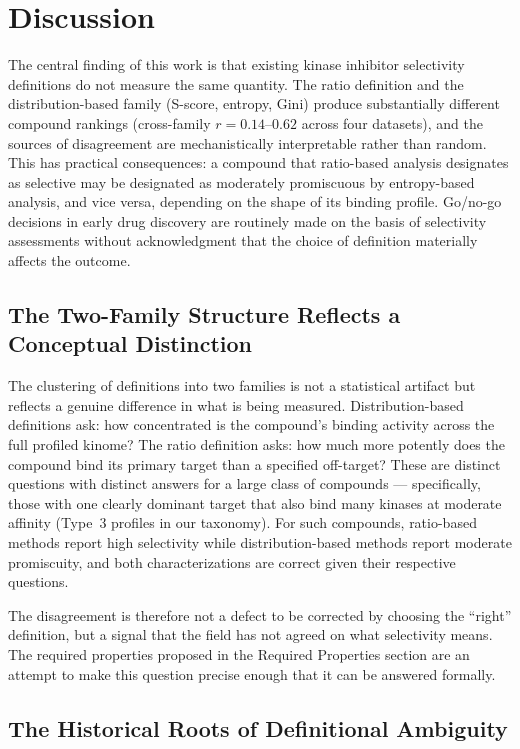 \documentclass[journal=jcisd8,manuscript=article]{achemso}
\begin{document}
\section{Discussion}
\label{sec:discussion}

The central finding of this work is that existing kinase inhibitor selectivity
definitions do not measure the same quantity.
The ratio definition and the distribution-based family (S-score, entropy, Gini)
produce substantially different compound rankings (cross-family
$r = 0.14$--$0.62$ across four datasets), and the sources of disagreement are
mechanistically interpretable rather than random.
This has practical consequences: a compound that ratio-based analysis designates
as selective may be designated as moderately promiscuous by entropy-based
analysis, and vice versa, depending on the shape of its binding profile.
Go/no-go decisions in early drug discovery are routinely made on the basis of
selectivity assessments without acknowledgment that the choice of definition
materially affects the outcome.

\subsection{The Two-Family Structure Reflects a Conceptual Distinction}

The clustering of definitions into two families is not a statistical artifact
but reflects a genuine difference in what is being measured.
Distribution-based definitions ask: how concentrated is the compound's binding
activity across the full profiled kinome?
The ratio definition asks: how much more potently does the compound bind its
primary target than a specified off-target?
These are distinct questions with distinct answers for a large class of
compounds --- specifically, those with one clearly dominant target that also
bind many kinases at moderate affinity (Type~3 profiles in our taxonomy).
For such compounds, ratio-based methods report high selectivity while
distribution-based methods report moderate promiscuity, and both
characterizations are correct given their respective questions.

The disagreement is therefore not a defect to be corrected by choosing the
``right'' definition, but a signal that the field has not agreed on what
selectivity means.
The required properties proposed in the Required Properties section are an
attempt to make this question precise enough that it can be answered formally.

\subsection{The Historical Roots of Definitional Ambiguity}
\end{document}
